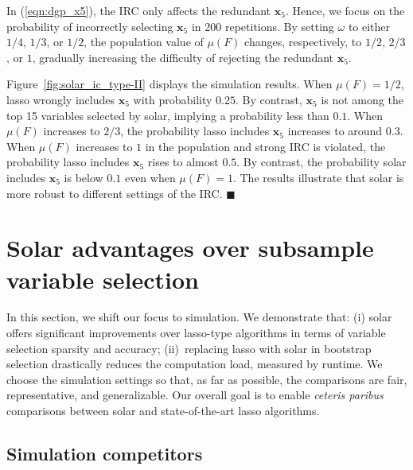 \documentclass[11pt,review,authoryear]{elsarticle}
\begin{document}
In (\ref{eqn:dgp_x5}), the IRC only affects the redundant $\mathbf{x}_5$. Hence, we focus on the probability of incorrectly selecting $\mathbf{x}_5$ in 200 repetitions. By setting $\omega$ to either $1/4$, $1/3$, or $1/2$, the population value of $\mu \left( F \right)$ changes, respectively, to $1/2$, $2/3$, or $1$, gradually increasing the difficulty of rejecting the redundant $\mathbf{x}_5$.

Figure~\ref{fig:solar_ic_type-II} displays the simulation results. When $\mu \left( F \right) = 1/2$, lasso wrongly includes $\mathbf{x}_5$ with probability $0.25$. By contrast, $\mathbf{x}_5$ is not among the top 15 variables selected by solar, implying a probability less than $0.1$. When $\mu \left( F \right)$ increases to $2/3$, the probability lasso includes $\mathbf{x}_5$ increases to around $0.3$. When $\mu \left( F \right)$ increases to $1$ in the population and strong IRC is violated, the probability lasso includes $\mathbf{x}_5$ rises to almost $0.5$. By contrast, the probability solar includes $\mathbf{x}_5$ is below $0.1$ even when $\mu\left(F\right)=1$. The results illustrate that solar is more robust to different settings of the IRC. $\blacksquare$



\section{Solar advantages over subsample variable selection\label{section:comp}}

In this section, we shift our focus to simulation. We demonstrate that: (i) solar offers significant improvements over lasso-type algorithms in terms of variable selection sparsity and accuracy; (ii)~replacing lasso with solar in bootstrap selection drastically reduces the computation load, measured by runtime. We choose the simulation settings so that, as far as possible, the comparisons are fair, representative, and generalizable. Our overall goal is to enable \emph{ceteris paribus} comparisons between solar and state-of-the-art lasso algorithms.

\subsection{Simulation competitors}
\end{document}
